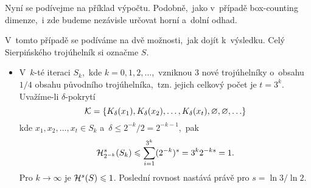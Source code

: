Nyní se podívejme na příklad výpočtu. Podobně,~jako v~případě box-counting dimenze,~i zde budeme nezávisle určovat horní a~dolní odhad.
\begin{example}\label{ex:sierpinskeho-trojuhelnik-hd-dimenze}
    V~tomto případě se podíváme na dvě možnosti,~jak dojít k~výsledku. Celý Sierpińského trojúhelník si označme $S$.
    \begin{itemize}
        \item V~$k$-té iteraci $S_k$,~kde $k=0,1,2,\ldots$,~vzniknou 3 nové trojúhelníky o~obsahu $1/4$ obsahu původního trojúhelníka,~tzn. jejich celkový počet je $t=3^k$. Uvažíme-li $\delta$-pokrytí
        \[\mathcal{K}=\set{K_\delta(x_1),K_\delta(x_2),\ldots,K_\delta(x_t),\emptyset,\emptyset,\ldots}\]
        kde $x_1,x_2,\ldots,x_t\in S_k$ a~$\delta\leqslant 2^{-k}/2=2^{-k-1}$,~pak
        \[\hausdorffdeltameasure{s}{2^{-k}}(S_k)\leqslant\sum_{i=1}^{3^k}(2^{-k})^s=3^k2^{-ks}=1.\]
        Pro $k\to\infty$ je $\hausdorffmeasure{s}(S)\leqslant 1$. Poslední rovnost nastává právě pro $s=\ln{3}/\ln{2}$.


\end{itemize}
\end{example}
